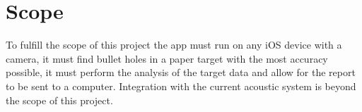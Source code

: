 \section{Scope}
To fulfill the scope of this project the app must run on any iOS device with a camera, it must find bullet holes in a paper target with the most accuracy possible, it must perform the analysis of the target data and allow for the report to be sent to a computer. Integration with the current acoustic system is beyond the scope of this project.
